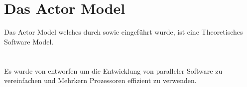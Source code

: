 \chapter{Das Actor Model}
Das Actor Model welches durch \cite{hewitt1973session} sowie \cite{Agha1985ActorsSystems} eingeführt wurde, ist eine Theoretisches Software Model. 
\citet{hewitt1973session} \\
\citep{hewitt1973session} \\
\citeauthor{hewitt1973session} \\
\citealt{hewitt1973session} 
Es wurde von \cite{hewitt1973session} entworfen um die Entwicklung von paralleler Software zu vereinfachen und Mehrkern Prozessoren effizient zu verwenden.